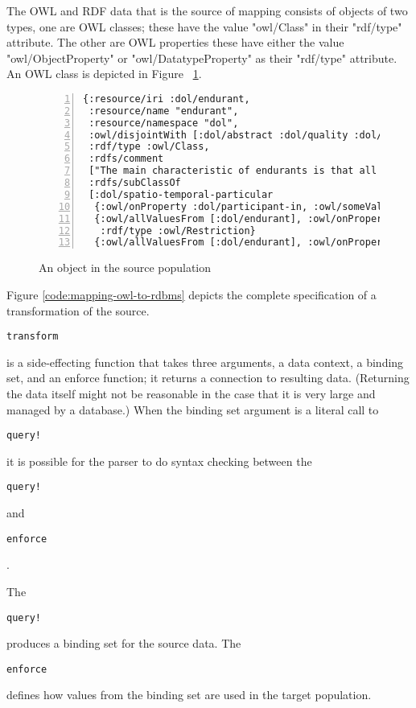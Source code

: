 \documentclass[9pt,letterpaper]{article}
\newcommand{\stt}[1]{\begin{footnotesize}\texttt{#1}\end{footnotesize}}
\begin{document}
The OWL and RDF data that is the source of mapping consists of objects of two types,
one are OWL classes; these have the value  "owl/Class" in their "rdf/type" attribute.
The other are OWL properties these have either the value "owl/ObjectProperty" or "owl/DatatypeProperty" as
their "rdf/type" attribute. An OWL class is depicted in Figure ~\ref{code:endurant}.

\begin{figure}[H]
  \caption{An object in the source population}
  \label{code:endurant}
\begin{lstlisting}[numberstyle=\scriptsize,basicstyle=\ttfamily\scriptsize,numbers=left,stepnumber=1,breaklines=true]
{:resource/iri :dol/endurant,
 :resource/name "endurant",
 :resource/namespace "dol",
 :owl/disjointWith [:dol/abstract :dol/quality :dol/perdurant],
 :rdf/type :owl/Class,
 :rdfs/comment
 ["The main characteristic of endurants is that all of them are independent essential wholes..."],
 :rdfs/subClassOf
 [:dol/spatio-temporal-particular
  {:owl/onProperty :dol/participant-in, :owl/someValuesFrom [:dol/perdurant], :rdf/type :owl/Restriction}
  {:owl/allValuesFrom [:dol/endurant], :owl/onProperty :dol/specific-constant-constituent,
   :rdf/type :owl/Restriction}
  {:owl/allValuesFrom [:dol/endurant], :owl/onProperty :dol/part, :rdf/type :owl/Restriction}]}
\end{lstlisting}
\end{figure}

Figure \ref{code:mapping-owl-to-rdbms} depicts the complete specification of a transformation of the source. 
\stt{transform} is a side-effecting function that takes three arguments, a data context, a binding set, and an enforce function;
it returns a connection to resulting data.
(Returning the data itself might not be reasonable in the case that it is very large and managed by a database.)
When the binding set argument is a literal call to \stt{query!} it is possible for the parser to do syntax checking between
the \stt{query!} and \stt{enforce}. 

The \stt{query!} produces a binding set for the source data.
The \stt{enforce} defines how values from the binding set are used in the target population.
\end{document}
